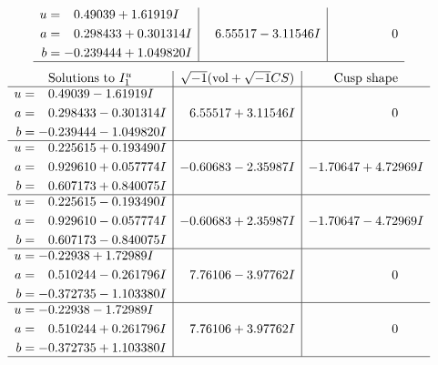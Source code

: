 \documentclass[1p]{elsarticle_modified}
\theoremstyle{definition}
\newcommand{\I}{\sqrt{-1}}
\begin{document}
$$\begin{array}{c|c|c}
\begin{aligned}
u &= \phantom{-}0.49039 + 1.61919 I \\
a &= \phantom{-}0.298433 + 0.301314 I \\
b &= -0.239444 + 1.049820 I\end{aligned}
 & \phantom{-}6.55517 - 3.11546 I & \phantom{-0.000000 } 0\\
 \hline 
 \end{array}$$\newpage$$\begin{array}{c|c|c}  
\text{Solutions to }I^u_{1}& \I (\text{vol} + \sqrt{-1}CS) & \text{Cusp shape}\\
 \hline 
\begin{aligned}
u &= \phantom{-}0.49039 - 1.61919 I \\
a &= \phantom{-}0.298433 - 0.301314 I \\
b &= -0.239444 - 1.049820 I\end{aligned}
 & \phantom{-}6.55517 + 3.11546 I & \phantom{-0.000000 } 0 \\ \hline\begin{aligned}
u &= \phantom{-}0.225615 + 0.193490 I \\
a &= \phantom{-}0.929610 + 0.057774 I \\
b &= \phantom{-}0.607173 + 0.840075 I\end{aligned}
 & -0.60683 - 2.35987 I & -1.70647 + 4.72969 I \\ \hline\begin{aligned}
u &= \phantom{-}0.225615 - 0.193490 I \\
a &= \phantom{-}0.929610 - 0.057774 I \\
b &= \phantom{-}0.607173 - 0.840075 I\end{aligned}
 & -0.60683 + 2.35987 I & -1.70647 - 4.72969 I \\ \hline\begin{aligned}
u &= -0.22938 + 1.72989 I \\
a &= \phantom{-}0.510244 - 0.261796 I \\
b &= -0.372735 - 1.103380 I\end{aligned}
 & \phantom{-}7.76106 - 3.97762 I & \phantom{-0.000000 } 0 \\ \hline\begin{aligned}
u &= -0.22938 - 1.72989 I \\
a &= \phantom{-}0.510244 + 0.261796 I \\
b &= -0.372735 + 1.103380 I\end{aligned}
 & \phantom{-}7.76106 + 3.97762 I & \phantom{-0.000000 } 0\\
 \hline 
 \end{array}$$\newpage\newpage\renewcommand{\arraystretch}{1}
\end{document}
